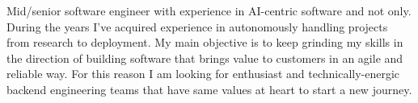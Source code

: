 \documentclass[9pt, green]{template/developercv} %
\begin{document}
\vspace{2.1mm}
{\small 
\hspace{10pt} 

	Mid/senior software engineer with experience in AI-centric software and not only. During the years I've acquired experience in autonomously handling projects from research to deployment. My main objective is to keep grinding my skills in the direction of building software that brings value to customers in an agile and reliable way. For this reason I am looking for enthusiast and technically-energic backend engineering teams that have same values at heart to start a new journey.

\vspace{2pt}
\vspace{2.1mm}
\begin{entrylist}


\end{entrylist}}
\end{document}
